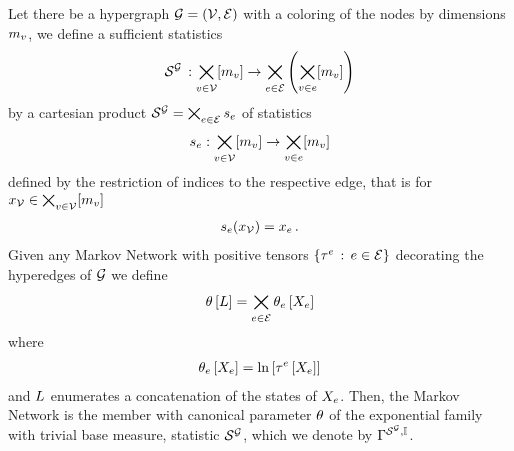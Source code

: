 \begin{theorem}
    \label{the:markovNetworkExponentialFamilies}
    Let there be a hypergraph $\mathcal{G}=(\mathcal{V},\mathcal{E})$ with a coloring of the nodes by dimensions $m_{v}$, we define a sufficient statistics
    \begin{align*}
        \mathcal{S}^{\mathcal{G}} \, : \bigtimes_{v\in\mathcal{V}} [m_{v}] \rightarrow \bigtimes_{e\in\mathcal{E}}\left(\bigtimes_{v\in e}[m_{v}]\right)
    \end{align*}
    by a cartesian product $\mathcal{S}^{\mathcal{G}} = \bigtimes_{e\in\mathcal{E}} s_{e}$ of statistics
    \begin{align*}
        s_{e} : \bigtimes_{v\in\mathcal{V}} [m_{v}] \rightarrow \bigtimes_{v\in e} [m_{v}]
    \end{align*}
    defined by the restriction of indices to the respective edge, that is for $x_{\mathcal{V}}\in\bigtimes_{v\in\mathcal{V}}[m_{v}]$
    \begin{align*}
        s_{e}(x_{\mathcal{V}}) = x_{e} \, .
    \end{align*}
    Given any Markov Network with positive tensors $\{\tau^{e} \,:\,e\in\mathcal{E}\}$ decorating the hyperedges of $\mathcal{G}$ we define
    \begin{align*}
        \theta\left[L\right] = \bigtimes_{e\in\mathcal{E}} \theta_{e}\left[X_{e}\right]
    \end{align*}
    where
    \begin{align*}
        \theta_{e}\left[X_{e}\right] =  \ln \left[ \tau^{e}\left[X_{e}\right] \right]
    \end{align*}
    and $L$ enumerates a concatenation of the states of $X_{e}$.
    Then, the Markov Network is the member with canonical parameter $\theta$ of the exponential family with trivial base measure, statistic $\mathcal{S}^{\mathcal{G}}$, which we denote by $\Gamma^{\mathcal{S}^{\mathcal{G}},\mathbb{I}}$.
\end{theorem}
